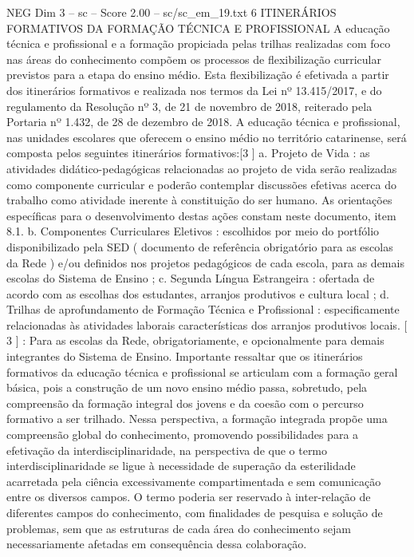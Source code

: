 \begin{textsample}{NEG Dim 3 – sc – Score 2.00 – sc/sc\_em\_19.txt}  \label{ex:f3_neg_228}
6 ITINERÁRIOS FORMATIVOS DA FORMAÇÃO TÉCNICA E PROFISSIONAL A educação técnica e profissional e a formação propiciada pelas trilhas realizadas com foco nas áreas do conhecimento compõem os processos de flexibilização curricular previstos para a etapa do ensino médio.
Esta flexibilização é efetivada a partir dos itinerários formativos e realizada nos termos da Lei nº 13.415/2017, e do regulamento da Resolução nº 3, de 21 de novembro de 2018, reiterado pela Portaria nº 1.432, de 28 de dezembro de 2018.
A educação técnica e profissional, nas unidades escolares que oferecem o ensino médio no território catarinense, será composta pelos seguintes itinerários formativos:[3 ] a.
Projeto de Vida : as atividades didático-pedagógicas relacionadas ao projeto de vida serão realizadas como componente curricular e poderão contemplar discussões efetivas acerca do trabalho como atividade inerente à constituição do ser humano.
As orientações específicas para o desenvolvimento destas ações constam neste documento, item 8.1. b.
Componentes Curriculares Eletivos : escolhidos por meio do portfólio disponibilizado pela SED ( documento de referência obrigatório para as escolas da Rede ) e/ou definidos nos projetos pedagógicos de cada escola, para as demais escolas do Sistema de Ensino ; c.
Segunda Língua Estrangeira : ofertada de acordo com as escolhas dos estudantes, arranjos produtivos e cultura local ; d.
Trilhas de aprofundamento de Formação Técnica e Profissional : especificamente relacionadas às atividades laborais características dos arranjos produtivos locais. [ 3 ] : Para as escolas da Rede, obrigatoriamente, e opcionalmente para demais integrantes do Sistema de Ensino.
Importante ressaltar que os itinerários formativos da educação técnica e profissional se articulam com a formação geral básica, pois a construção de um novo ensino médio passa, sobretudo, pela compreensão da formação integral dos jovens e da coesão com o percurso formativo a ser trilhado.
Nessa perspectiva, a formação integrada propõe uma compreensão global do conhecimento, promovendo possibilidades para a efetivação da interdisciplinaridade, na perspectiva de que o termo interdisciplinaridade se ligue à necessidade de superação da esterilidade acarretada pela ciência excessivamente compartimentada e sem comunicação entre os diversos campos.
O termo poderia ser reservado à inter-relação de diferentes campos do conhecimento, com finalidades de pesquisa e solução de problemas, sem que as estruturas de cada área do conhecimento sejam necessariamente afetadas em consequência dessa colaboração.

\end{textsample}

